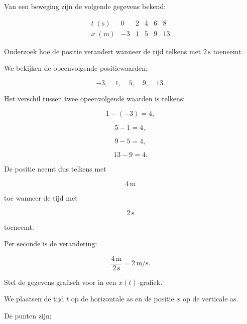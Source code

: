 \documentclass{ximera}
\begin{document}
  
  
  
  \begin{oefening}{\oefU\ESS}
  
  Van een beweging zijn de volgende gegevens bekend:
  
  \[
  \begin{array}{c|ccccc}
  t\;(\mathrm{s}) & 0 & 2 & 4 & 6 & 8\\ \hline
  x\;(\mathrm{m}) & -3 & 1 & 5 & 9 & 13
  \end{array}
  \]
  
  \begin{question}
  Onderzoek hoe de positie verandert wanneer de tijd telkens met
  $2\,\mathrm{s}$ toeneemt.
  
  \begin{oplossing}
  We bekijken de opeenvolgende positiewaarden:
  
  \[
  -3,\quad 1,\quad 5,\quad 9,\quad 13.
  \]
  
  Het verschil tussen twee opeenvolgende waarden is telkens:
  
  \[
  1-(-3)=4,
  \]
  
  \[
  5-1=4,
  \]
  
  \[
  9-5=4,
  \]
  
  \[
  13-9=4.
  \]
  
  De positie neemt dus telkens met
  
  \[
  4\,\mathrm{m}
  \]
  
  toe wanneer de tijd met
  
  \[
  2\,\mathrm{s}
  \]
  
  toeneemt.
  
  Per seconde is de verandering:
  
  \[
  \frac{4\,\mathrm{m}}{2\,\mathrm{s}}
  =
  2\,\mathrm{m/s}.
  \]
  \end{oplossing}
  \end{question}
  
  
  \begin{question}
  Stel de gegevens grafisch voor in een $x(t)$-grafiek.
  
  \begin{oplossing}
  We plaatsen de tijd $t$ op de horizontale as en de positie $x$ op de
  verticale as.
  
  De punten zijn:
  

\end{oplossing}
\end{question}
\end{oefening}
\end{document}
